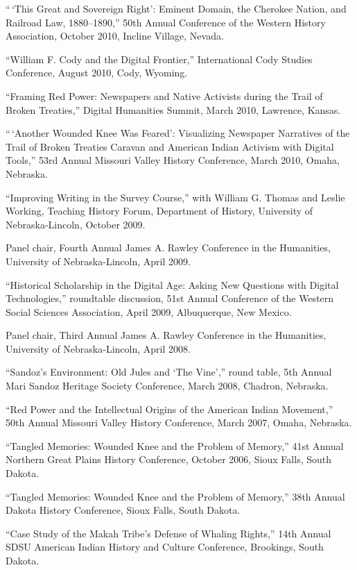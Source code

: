 ``\,`This Great and Sovereign Right': Eminent Domain, the Cherokee
Nation, and Railroad Law, 1880--1890,'' 50th Annual Conference of the
Western History Association, October 2010, Incline Village, Nevada.

``William F. Cody and the Digital Frontier,'' International Cody Studies
Conference, August 2010, Cody, Wyoming.

``Framing Red Power: Newspapers and Native Activists during the Trail of
Broken Treaties,'' Digital Humanities Summit, March 2010, Lawrence,
Kansas.

``\,`Another Wounded Knee Was Feared': Visualizing Newspaper Narratives
of the Trail of Broken Treaties Caravan and American Indian Activism
with Digital Tools,'' 53rd Annual Missouri Valley History Conference,
March 2010, Omaha, Nebraska.

``Improving Writing in the Survey Course,'' with William G. Thomas and
Leslie Working, Teaching History Forum, Department of History,
University of Nebraska-Lincoln, October 2009.

Panel chair, Fourth Annual James A. Rawley Conference in the Humanities,
University of Nebraska-Lincoln, April 2009.

``Historical Scholarship in the Digital Age: Asking New Questions with
Digital Technologies,'' roundtable discussion, 51st Annual Conference of
the Western Social Sciences Association, April 2009, Albuquerque, New
Mexico.

Panel chair, Third Annual James A. Rawley Conference in the Humanities,
University of Nebraska-Lincoln, April 2008.

``Sandoz's Environment: Old Jules and `The Vine','' round table, 5th
Annual Mari Sandoz Heritage Society Conference, March 2008, Chadron,
Nebraska.

``Red Power and the Intellectual Origins of the American Indian
Movement,'' 50th Annual Missouri Valley History Conference, March 2007,
Omaha, Nebraska.

``Tangled Memories: Wounded Knee and the Problem of Memory,'' 41st
Annual Northern Great Plains History Conference, October 2006, Sioux
Falls, South Dakota.

``Tangled Memories: Wounded Knee and the Problem of Memory,'' 38th
Annual Dakota History Conference, Sioux Falls, South Dakota.

``Case Study of the Makah Tribe's Defense of Whaling Rights,'' 14th
Annual SDSU American Indian History and Culture Conference, Brookings,
South Dakota.

